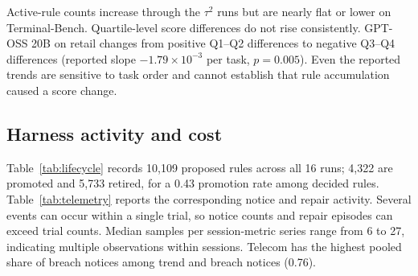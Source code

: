 \documentclass[11pt,letterpaper]{article}
\begin{document}
Active-rule counts increase through the $\tau^2$ runs but are nearly
flat or lower on Terminal-Bench. Quartile-level score differences
do not rise consistently. GPT-OSS 20B
on retail changes from positive Q1--Q2 differences to negative Q3--Q4
differences (reported slope $-1.79\times10^{-3}$ per task,
$p=0.005$). Even the reported trends are sensitive to task order and
cannot establish that rule accumulation caused a score change.

\subsection{Harness activity and cost}
\label{sec:telemetry}
Table~\ref{tab:lifecycle} records 10,109 proposed rules across all
16 runs; 4,322 are promoted and 5,733 retired, for a 0.43
promotion rate among decided rules. Table~\ref{tab:telemetry} reports
the corresponding notice and repair activity. Several events can
occur within a single trial, so notice counts and repair episodes
can exceed trial counts. Median samples per session-metric series
range from 6 to 27, indicating multiple observations within
sessions. Telecom has the highest pooled share of breach notices
among trend and breach notices (0.76).
\end{document}
